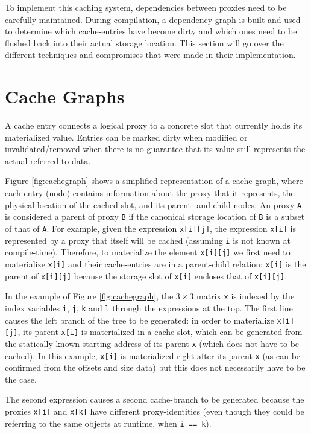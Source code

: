 To implement this caching system, dependencies between proxies need to be carefully maintained. During compilation, a dependency graph is built and used to determine which cache-entries have become dirty and which ones need to be flushed back into their actual storage location. This section will go over the different techniques and compromises that were made in their implementation.

\section{Cache Graphs}
A cache entry connects a logical proxy to a concrete slot that currently holds its materialized value. Entries can be marked dirty when modified or invalidated/removed when there is no guarantee that its value still represents the actual referred-to data.

Figure \ref{fig:cachegraph} shows a simplified representation of a cache graph, where each entry (node) contains information about the proxy that it represents, the physical location of the cached slot, and its parent- and child-nodes. An proxy \texttt{A} is considered a parent of proxy \texttt{B} if the canonical storage location of \texttt{B} is a subset of that of \texttt{A}. For example, given the expression \texttt{x[i][j]}, the expression \texttt{x[i]} is represented by a proxy that itself will be cached (assuming \texttt{i} is not known at compile-time). Therefore, to materialize the element \texttt{x[i][j]} we first need to materialize \texttt{x[i]} and their cache-entries are in a parent-child relation: \texttt{x[i]} is the parent of \texttt{x[i][j]} because the storage slot of \texttt{x[i]} encloses that of \texttt{x[i][j]}.

In the example of Figure \ref{fig:cachegraph}, the $3\times 3$ matrix \texttt{x} is indexed by the index variables \texttt{i}, \texttt{j}, \texttt{k} and \texttt{l} through the expressions at the top. The first line causes the left branch of the tree to be generated: in order to materialize \texttt{x[i][j]}, its parent \texttt{x[i]} is materialized in a cache slot, which can be generated from the statically known starting address of its parent \texttt{x} (which does not have to be cached). In this example, \texttt{x[i]} is materialized right after its parent \texttt{x} (as can be confirmed from the offsets and size data) but this does not necessarily have to be the case.

The second expression causes a second cache-branch to be generated because the proxies \texttt{x[i]} and \texttt{x[k]} have different proxy-identities (even though they could be referring to the same objects at runtime, when \texttt{i == k}).

